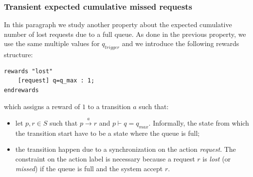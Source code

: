 \subsubsection{Transient expected cumulative missed requests }
In this paragraph we study another property about the expected
cumulative number of lost requests due to a full queue. As done in the
previous property, we use the same multiple values for $q_{trigger}$
and we introduce the following rewards structure:
\begin{verbatim}
rewards "lost"
	[request] q=q_max : 1;
endrewards
\end{verbatim}
which assigns a reward of $1$ to a transition $a$ such that:
\begin{itemize}
\item let $p, r \in S$ such that $ p \xrightarrow{a} r$ and $p \vdash
  q= q_{max}$. Informally, the state from which the transition start
  have to be a state where the queue is full;
\item the transition happen due to a synchronization on the action
  \emph{request}. The constraint on the action label is necessary
  because a request $r$ is \emph{lost} (or \emph{missed}) if the queue
  is full and the system accept $r$.
\end{itemize}

